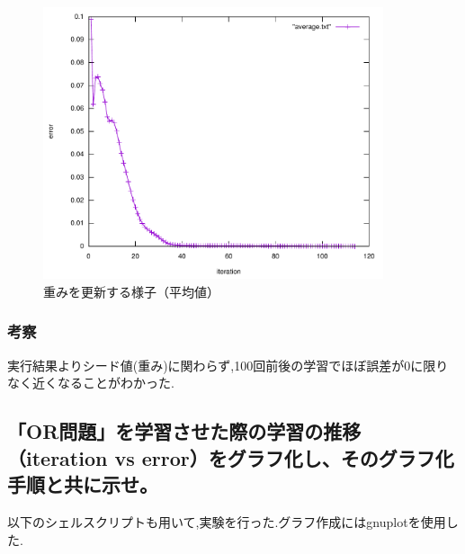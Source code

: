 \begin{figure}[h]
 \begin{center}
  \includegraphics[width=10.0cm]{figs/level1/average.pdf}
  \caption{重みを更新する様子（平均値）}
  \label{fig:level1-2}
 \end{center}
\end{figure}


\subsubsection{考察}
実行結果よりシード値(重み)に関わらず,100回前後の学習でほぼ誤差が0に限りなく近くなることがわかった.

\subsection{「OR問題」を学習させた際の学習の推移（iteration vs error）をグラフ化し、そのグラフ化手順と共に示せ。}

以下のシェルスクリプトも用いて,実験を行った.グラフ作成にはgnuplotを使用した.









